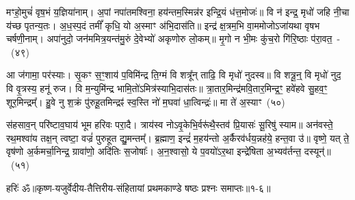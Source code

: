 मꣳहो॒मुचं॑ वृष॒भं य॒ज्ञिया॑नाम्। अ॒पां नपा॑तमश्विना॒ हय॑न्तम॒स्मिन्न॑र इन्द्रि॒यं ध॑त्त॒मोजः॑॥ वि न॑ इन्द्र॒ मृधो॑ जहि नी॒चा य॑च्छ पृतन्य॒तः। अ॒ध॒स्प॒दं तमीं᳚ कृधि॒ यो अ॒स्माꣳ अ॑भि॒दास॑ति॥ इन्द्र॑ क्ष॒त्रम॒भि वा॒ममोजो\-ऽजा॑यथा वृषभ चर्\mbox{}षणी॒नाम्। अपा॑नुदो॒ जन॑ममित्र॒यन्त॑मु॒रुं दे॒वेभ्यो॑ अकृणोरु लो॒कम्॥ मृ॒गो न भी॒मः कु॑च॒रो गि॑रि॒ष्ठाः प॑रा॒वत॒~-~(४९)\ip

आ ज॑गामा॒ पर॑स्याः। सृ॒कꣳ स॒ꣳ॒शाय॑ प॒विमि॑न्द्र ति॒ग्मं वि शत्रू᳚न् ताढि॒ वि मृधो॑ नुदस्व॥ वि शत्रू॒न्॒ वि मृधो॑ नुद॒ वि वृ॒त्रस्य॒ हनू॑ रुज। वि म॒न्युमि॑न्द्र भामि॒तो॑\-ऽमित्र॑स्याभि॒दास॑तः॥ त्रा॒तार॒मिन्द्र॑मवि॒तार॒मिन्द्र॒ꣳ॒ हवे॑हवे सु॒हव॒ꣳ॒ शूर॒मिन्द्रम्᳚। हु॒वे नु श॒क्रं पु॑रुहू॒तमिन्द्रꣴ॑ स्व॒स्ति नो॑ म॒घवा॑ धा॒त्विन्द्रः॑॥ मा ते॑ अ॒स्याꣳ~(५०)\ip

स॑हसाव॒न् परि॑ष्टाव॒घाय॑ भूम हरिवः परा॒दै। त्राय॑स्व नो\-ऽवृ॒केभि॒र्वरू॑थै॒स्तव॑ प्रि॒यासः॑ सू॒रिषु॑ स्याम॥ अन॑वस्ते॒ रथ॒मश्वा॑य तक्ष॒न् त्वष्टा॒ वज्रं॑ पुरुहूत द्यु॒मन्तम्᳚। ब्र॒ह्माण॒ इन्द्रं॑ म॒हय॑न्तो अ॒र्कैरव॑र्धय॒न्नह॑ये॒ हन्त॒वा उ॑॥ वृष्णे॒ यत् ते॒ वृष॑णो अ॒र्कमर्चा॒निन्द्र॒ ग्रावा॑णो॒ अदि॑तिः स॒जोषाः᳚। अ॒न॒श्वासो॒ ये प॒वयो॑\-ऽर॒था इन्द्रे॑षिता अ॒भ्यव॑र्तन्त॒ दस्यून्॑॥~(५१)\ip

{\anuvakamend[{वृ॒त्र॒हत्ये\-ऽनु॑ गाय॒त्रिणो᳚\-ऽध्व॒राणां᳚ परा॒वतो॒\-ऽस्याम॒ष्टाच॑त्वारिꣳशच्च}]}%

{हरिः॑ ॐ}{॥कृष्ण-यजुर्वेदीय-तैत्तिरीय-संहितायां प्रथमकाण्डे षष्ठः प्रश्नः समाप्तः॥१-६॥}


